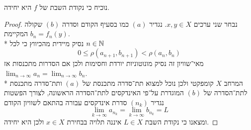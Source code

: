 \Subquestion{}
נוכיח כי נקודת השבת של $f$ היא יחידה.
\begin{proof}
	נבחר שני ערכים $x, y \in X$. נגדיר $(a)$ כמו בסעיף הקודם וסדרה $(b)$ שקולה המקיימת $b_n = f_n(y)$. \\*
	נסיק מיידית מהכיווץ כי לכל $n \in \mathbb{N}$
	\[
		0 \le \rho(a_{n + 1}, b_{n + 1}) < \rho(a_n, b_n)
	\]
	מאי־שוויון זה נסיק מונוטוניות יורדת וחסימות ולכן אם הסדרות מתכנסות אז $\lim_{n \to \infty} a_n = \lim_{n \to \infty} b_n$. \\*
	המרחב $X$ קומפקטי ולכן נוכל למצוא תת־סדרה מתכנסת של $(a)$ ותת־סדרה מתכנסת לתת־הסדרה של $(b)$ המוגדרת על־פי האינדקסים לתת־הסדרה הראשונה, לצורך הפשטות נגדיר $(n_k)$ סדרת אינדקסים עבורה בהתאם לשוויון הקודם
	\[
		\lim_{k \to \infty} a_{n_k}
		= \lim_{k \to \infty} b_{n_k}
		= L
	\]
	ומצאנו כי נקודת השבת $L \in X$ איננה תלויה בבחירת $x \in X$ ולכן היא יחידה.
\end{proof}

